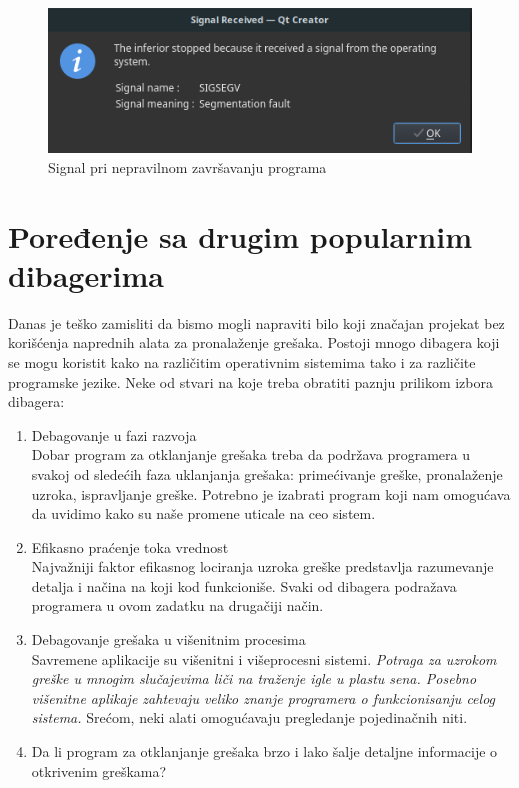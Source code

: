 \documentclass[a4paper]{article}
\begin{document}
\begin{figure}[h!]
\begin{center}
\includegraphics[scale=0.5]{signals.png}
\end{center}
\caption{Signal pri nepravilnom završavanju programa}
\label{fig:signals}
\end{figure}


\section{Poređenje sa drugim popularnim dibagerima}
\label{sec:poredjenje}
Danas je teško zamisliti da bismo mogli napraviti bilo koji značajan projekat bez korišćenja
naprednih alata za pronalaženje grešaka. Postoji mnogo dibagera koji se mogu koristit kako
na različitim operativnim sistemima tako i za različite programske jezike. 
Neke od stvari na koje treba obratiti paznju prilikom izbora dibagera:

\begin{enumerate}
\item Debagovanje u fazi razvoja \\
Dobar program za otklanjanje grešaka treba da podržava
programera u svakoj od sledećih faza uklanjanja grešaka:
primećivanje greške, pronalaženje uzroka, ispravljanje greške.
Potrebno je izabrati program koji nam omogućava da uvidimo kako
su naše promene uticale na ceo sistem.
\item Efikasno praćenje toka vrednost\\
Najvažniji faktor efikasnog lociranja uzroka greške predstavlja
razumevanje detalja i načina na koji kod funkcioniše. Svaki od
dibagera podražava programera u ovom zadatku na drugačiji način.
\item Debagovanje grešaka u višenitnim procesima\\
Savremene aplikacije su višenitni i višeprocesni sistemi. 
{\em Potraga za uzrokom greške u mnogim slučajevima liči na traženje igle u
plastu sena. Posebno višenitne aplikaje zahtevaju veliko znanje
programera o funkcionisanju celog sistema.\cite{tools} } Srećom, neki alati
omogućavaju pregledanje pojedinačnih niti.
\item Da li program za otklanjanje grešaka brzo i lako šalje detaljne informacije o otkrivenim greškama?
\end{enumerate}
\end{document}
